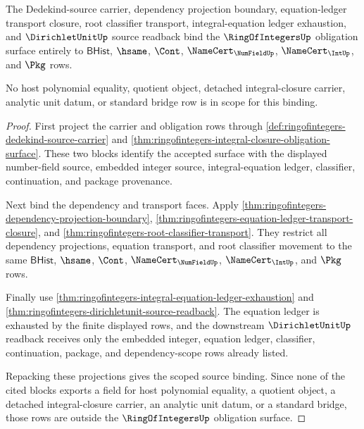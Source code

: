 \begin{theorem}
\label{thm:ringofintegers-scoped-bhist-source-binding}
The Dedekind-source carrier, dependency projection boundary,
equation-ledger transport closure, root classifier transport, integral-equation
ledger exhaustion, and $\DirichletUnitUp$ source readback bind the
$\RingOfIntegersUp$ obligation surface entirely to $\mathsf{BHist}$, $\hsame$,
$\Cont$, $\NameCert_{\NumFieldUp}$, $\NameCert_{\IntUp}$, and $\Pkg$ rows.

No host polynomial equality, quotient object, detached integral-closure
carrier, analytic unit datum, or standard bridge row is in scope for this
binding.
\end{theorem}
\begin{proof}
First project the carrier and obligation rows through
\autoref{def:ringofintegers-dedekind-source-carrier} and
\autoref{thm:ringofintegers-integral-closure-obligation-surface}. These two
blocks identify the accepted surface with the displayed number-field source,
embedded integer source, integral-equation ledger, classifier, continuation,
and package provenance.

Next bind the dependency and transport faces. Apply
\autoref{thm:ringofintegers-dependency-projection-boundary},
\autoref{thm:ringofintegers-equation-ledger-transport-closure}, and
\autoref{thm:ringofintegers-root-classifier-transport}. They restrict all
dependency projections, equation transport, and root classifier movement to
the same $\mathsf{BHist}$, $\hsame$, $\Cont$,
$\NameCert_{\NumFieldUp}$, $\NameCert_{\IntUp}$, and $\Pkg$ rows.

Finally use
\autoref{thm:ringofintegers-integral-equation-ledger-exhaustion} and
\autoref{thm:ringofintegers-dirichletunit-source-readback}. The equation
ledger is exhausted by the finite displayed rows, and the downstream
$\DirichletUnitUp$ readback receives only the embedded integer, equation
ledger, classifier, continuation, package, and dependency-scope rows already
listed.

Repacking these projections gives the scoped source binding. Since none of the
cited blocks exports a field for host polynomial equality, a quotient object,
a detached integral-closure carrier, an analytic unit datum, or a standard
bridge, those rows are outside the $\RingOfIntegersUp$ obligation surface.
\end{proof}

